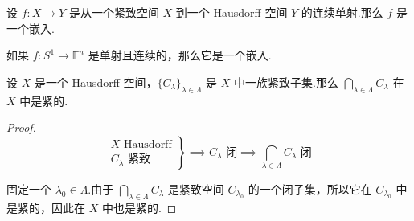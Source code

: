 \begin{proposition}
    设 $f: X \to Y$ 是从一个紧致空间 $X$ 到一个 Hausdorff 空间 $Y$ 的连续单射.那么 $f$ 是一个嵌入.
\end{proposition}

\begin{instance}
    如果 $f: S^1 \to \mathbb{E}^n$ 是单射且连续的，那么它是一个嵌入.
\end{instance}

\begin{lemma}
    设 $X$ 是一个 Hausdorff 空间，$\{C_\lambda\}_{\lambda \in \Lambda}$ 是 $X$ 中一族紧致子集.那么 $\bigcap_{\lambda \in \Lambda} C_\lambda$ 在 $X$ 中是紧的.
\end{lemma}
\begin{proof}
    \[
        \left.
        \begin{array}{r}
            X \text{ Hausdorff} \\
            C_\lambda \text{ 紧致}
        \end{array}
        \right\} \implies C_\lambda \text{ 闭} \implies \bigcap_{\lambda \in \Lambda} C_\lambda \text{ 闭}
    \]\par
    固定一个 $\lambda_0 \in \Lambda$.由于 $\bigcap_{\lambda \in \Lambda} C_\lambda$ 是紧致空间 $C_{\lambda_0}$ 的一个闭子集，所以它在 $C_{\lambda_0}$ 中是紧的，因此在 $X$ 中也是紧的.
\end{proof}

